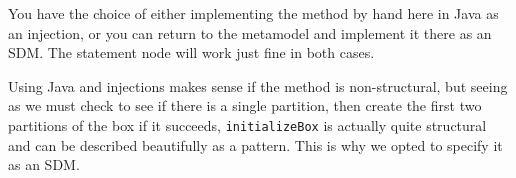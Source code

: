 You have the choice of either implementing the method by hand here in Java as an injection, or you can return to the metamodel and implement it there as an SDM.
The statement node will work just fine in both cases.

Using Java and injections makes sense if the method is non-structural, but seeing as we must check to see if there is a single partition, then create the
first two partitions of the box if it succeeds, \texttt{initializeBox} is actually quite structural and can be described beautifully as a pattern. This is why
we opted to specify it as an SDM.